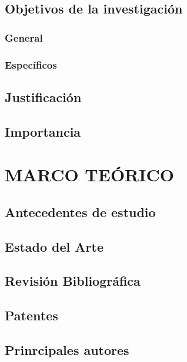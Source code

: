 \documentclass[12pt,a4paper,oneside]{book}
\begin{document}
\section{Objetivos de la investigación}

\subsection{General}

\subsection{Específicos}

\section{Justificación}

\section{Importancia}



\chapter{MARCO TEÓRICO}

\section{Antecedentes de estudio}

\section{Estado del Arte}

\section{Revisión Bibliográfica}

\section{Patentes}

\section{Prinrcipales autores}
\end{document}
